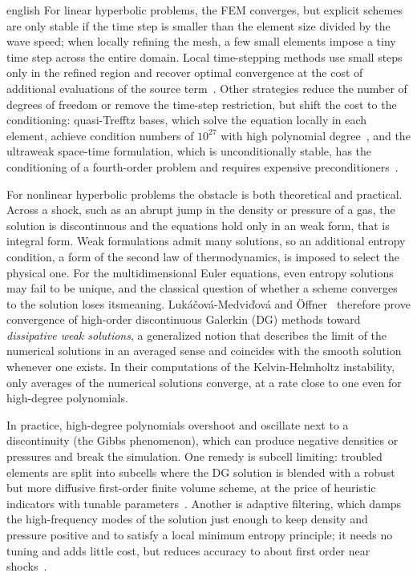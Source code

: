 \documentclass[0000.tex]{subfiles}
\begin{document}
\begin{hyphenrules}{english}
For linear hyperbolic problems, the FEM converges, but explicit schemes are only stable if the time step is smaller than the element size divided by the
wave speed; when locally refining the mesh, a few small elements impose a tiny time step across the entire domain. Local time-stepping
methods use small steps only in the refined region and recover optimal convergence at the cost of additional evaluations of the
source term~\cite{grote2026explicit}. Other strategies reduce the number of degrees of freedom or remove the time-step restriction, but shift the cost to
the conditioning: quasi-Trefftz bases, which solve the equation locally in each element, achieve condition numbers of $10^{27}$ with high polynomial
degree~\cite{imbert2023space}, and the ultraweak space-time formulation, which is unconditionally stable, has the conditioning of a fourth-order
problem and requires expensive preconditioners~\cite{henning2022ultraweak}.

For nonlinear hyperbolic problems the obstacle is both theoretical and practical. Across a shock, such as an abrupt jump in the density or pressure of
a gas, the solution is discontinuous and the equations hold only in an weak form, that is integral form. Weak formulations admit many solutions, so an
additional entropy condition, a form of the second law of thermodynamics, is imposed to select the physical one. For the multidimensional Euler equations, 
even entropy solutions may fail to be unique, and the classical question of whether a scheme converges to the solution loses itsmeaning. 
Luk\'a\v{c}ov\'a-Medvi\v{d}ov\'a and \"Offner~\cite{lukavcova2023convergence} therefore prove convergence of high-order discontinuous Galerkin (DG) methods
toward \emph{dissipative weak solutions}, a generalized notion that describes the limit of the numerical solutions in an averaged sense and coincides with
the smooth solution whenever one exists. In their computations of the Kelvin-Helmholtz instability, only averages of the numerical solutions converge, 
at a rate close to one even for high-degree polynomials.

In practice, high-degree polynomials overshoot and oscillate next to a discontinuity (the Gibbs phenomenon), which can produce negative densities or
pressures and break the simulation. One remedy is subcell limiting: troubled elements are split into subcells where the DG solution is blended with a
robust but more diffusive first-order finite volume scheme, at the price of heuristic indicators with tunable parameters~\cite{rueda2022subcell}. Another
is adaptive filtering, which damps the high-frequency modes of the solution just enough to keep density and pressure positive and to satisfy a local 
minimum entropy principle; it needs no tuning and adds little cost, but reduces accuracy to about first order near shocks~\cite{dzanic2022positivity}.


\end{hyphenrules}
\end{document}
